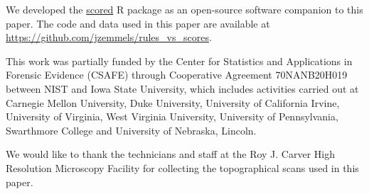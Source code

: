 \documentclass[reprint]{JASA}
\begin{document}
We developed the \href{https://jzemmels.github.io/scored/}{scored} R
package as an open-source software companion to this paper. The code and
data used in this paper are available at
\url{https://github.com/jzemmels/rules_vs_scores}.

\begin{acknowledgments}
This work was partially funded by the Center for Statistics and
Applications in Forensic Evidence (CSAFE) through Cooperative Agreement
70NANB20H019 between NIST and Iowa State University, which includes
activities carried out at Carnegie Mellon University, Duke University,
University of California Irvine, University of Virginia, West Virginia
University, University of Pennsylvania, Swarthmore College and
University of Nebraska, Lincoln.

We would like to thank the technicians and staff at the Roy J. Carver
High Resolution Microscopy Facility for collecting the topographical
scans used in this paper.

\end{acknowledgments}
\end{document}
